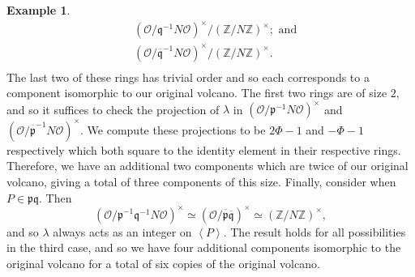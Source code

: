 \documentclass[11pt,a4paper]{amsart}
\theoremstyle{plain}
\theoremstyle{definition}
\newtheorem{eg}[thm]{Example}
\theoremstyle{remark}
\begin{document}
\begin{eg}
\begin{align*}
    &(\mathcal{O}/\mathfrak{q}^{-1}N\mathcal{O})^{\times}/(\mathbb{Z}/N \mathbb{Z})^{\times}; \text{ and} \\
    &(\mathcal{O}/\overline{\mathfrak{q}}^{-1}N\mathcal{O})^{\times}/(\mathbb{Z}/N \mathbb{Z})^{\times}.\\
  \end{align*}
  The last two of these rings has trivial order and so each corresponds to a component isomorphic to our original volcano. The first two rings are of size $2,$ and so it suffices to check the projection of $\lambda$ in $(\mathcal{O}/\mathfrak{p}^{-1}N\mathcal{O})^{\times}$ and $(\mathcal{O}/\overline{\mathfrak{p}}^{-1}N\mathcal{O})^{\times}.$ We compute these projections to be $2\Phi - 1$ and $-\Phi - 1$ respectively which both square to the identity element in their respective rings. Therefore, we have an additional two components which are twice of our original volcano, giving a total of three components of this size. Finally, consider when $P \in \mathfrak{p} \mathfrak{q}.$ Then
  \[
    (\mathcal{O}/\mathfrak{p}^{-1}\mathfrak{q}^{-1}N\mathcal{O})^{\times} \simeq (\mathcal{O}/\overline{\mathfrak{p}}\overline{\mathfrak{q}})^{\times} \simeq (\mathbb{Z}/N \mathbb{Z})^{\times},
  \]
  and so $\lambda$ always acts as an integer on $\left\langle P \right\rangle.$ The result holds for all possibilities in the third case, and so we have four additional components isomorphic to the original volcano for a total of six copies of the original volcano.
\end{eg}
\end{document}
